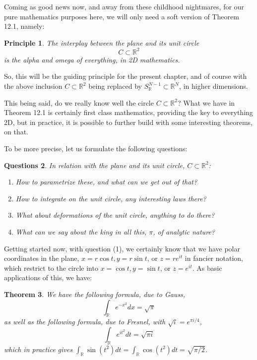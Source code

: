 \documentclass[12pt]{amsbook}
\newtheorem{theorem}{Theorem}[chapter]
\newtheorem{principle}[theorem]{Principle}
\newtheorem{questions}[theorem]{Questions}
\begin{document}
Coming as good news now, and away from these childhood nightmares, for our pure mathematics purposes here, we will only need a soft version of Theorem 12.1, namely:

\begin{principle}
The interplay between the plane and its unit circle
$$C\subset\mathbb R^2$$
is the alpha and omega of everything, in 2D mathematics.
\end{principle}

So, this will be the guiding principle for the present chapter, and of course with the above inclusion $C\subset\mathbb R^2$ being replaced by $S^{N-1}_\mathbb R\subset\mathbb R^N$, in higher dimensions.

\bigskip

This being said, do we really know well the circle $C\subset\mathbb R^2$? What we have in Theorem 12.1 is certainly first class mathematics, providing the key to everything 2D, but in practice, it is possible to further build with some interesting theorems, on that.

\bigskip

To be more precise, let us formulate the following questions:

\begin{questions}
In relation with the plane and its unit circle, $C\subset\mathbb R^2$:
\begin{enumerate}
\item How to parametrize these, and what can we get out of that?

\item How to integrate on the unit circle, any interesting laws there?

\item What about deformations of the unit circle, anything to do there?

\item What can we say about the king in all this, $\pi$, of analytic nature?
\end{enumerate}
\end{questions}

Getting started now, with question (1), we certainly know that we have polar coordinates in the plane, $x=r\cos t,y=r\sin t$, or $z=re^{it}$ in fancier notation, which restrict to the circle into $x=\cos t,y=\sin t$, or $z=e^{it}$. As basic applications of this, we have:


\begin{theorem}
We have the following formula, due to Gauss,
$$\int_\mathbb Re^{-x^2}dx=\sqrt{\pi}$$
as well as the following formula, due to Fresnel, with $\sqrt{i}=e^{\pi i/4}$,
$$\int_\mathbb R e^{it^2}dt=\sqrt{\pi i}$$
which in practice gives $\int_\mathbb R\sin(t^2)dt=\int_\mathbb R\cos(t^2)dt=\sqrt{\pi/2}$.
\end{theorem}
\end{document}
